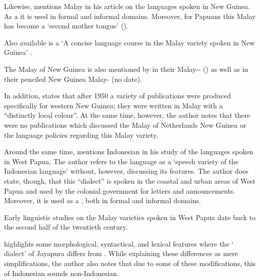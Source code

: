 {Likewise,{ \citet{Teutscher.1954}} mentions Malay in his article on the languages spoken in New Guinea. As a  it is used in formal and informal domains. Moreover, for Papuans this Malay has become a  ‘second mother tongue’ (\citeyear*[123]{Teutscher.1954}).



Also available is a  ‘A concise language course in the Malay variety spoken in New Guinea’ \citep{BureauCursussenenVertalingen.1950}.



The Malay of New Guinea is also mentioned by \citeauthor{Anceaux.1960} in their Malay--  (\citeyear*{Anceaux.1960}) as well as in their penciled New Guinea Malay-  {(no date)}.



In addition, {\citet[49]{Teeuw.1961}} states that after 1950 a variety of publications were produced specifically for western New Guinea; they were written in Malay with a  ``distinctly local colour''. At the same time, however, the author notes that there were no publications which discussed the Malay of Netherlands New Guinea or the language policies regarding this Malay variety.



Around the same time, {\citet{Moeliono.1963}} mentions Indonesian in his study of the languages spoken in West Papua. The author refers to the language as a  ‘speech variety of the Indonesian language’ without, however, discussing its features. The author does state, though, that this  ``dialect'' is spoken in the coastal and urban areas of West Papua and used by the  colonial government for letters and announcements. Moreover, it is used as a , both in formal and informal domains.



Early linguistic studies on the Malay varieties spoken in West Papua date back to the second half of the twentieth century.



\citet{Samaun.1979} highlights some morphological, syntactical, and lexical features where the  ‘ dialect’ of Jayapura differs from . While explaining these differences as mere simplifications, the author also notes that due to some of these modifications, this  of Indonesian sounds non-Indonesian.



}
